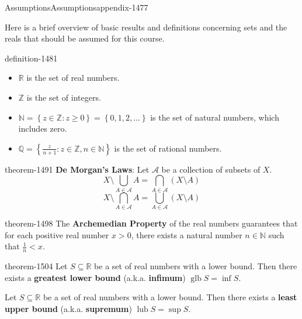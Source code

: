\documentclass[oneside,10pt,]{book}
\newcommand{\terminology}[1]{\textbf{#1}}
\newcommand{\mb}{\mathbb}
\newcommand{\mc}{\mathcal}
\newcommand{\glb}{\operatorname{glb}}
\newcommand{\lub}{\operatorname{lub}}
\newcommand{\setBuilder}[2]{\left\{#1:#2\right\}}
\newcommand{\setList}[1]{\left\{#1\right\}}
\newcommand{\lt}{<}
\begin{document}
%
%
%
%
\typeout{************************************************}
\typeout{************************************************}
%
%
\appendix
%
\begin{appendixptx}{Assumptions}{}{Assumptions}{}{}{appendix-1477}
\begin{introduction}{}%
\hypertarget{p-1480}{}%
Here is a brief overview of basic results and definitions concerning sets and the reals that should be assumed for this course.%
\end{introduction}%
\begin{definition}{}{definition-1481}%
\leavevmode%
\begin{itemize}[label=\textbullet]
\item{}\(\mb R\) is the set of real numbers.%
\item{}\(\mb Z\) is the set of integers.%
\item{}\(\mb N=\setBuilder{z\in\mb Z}{z\geq 0}=\setList{0,1,2,\dots}\) is the set of natural numbers, which includes zero.%
\item{}\(\mb Q=\setBuilder{\frac{z}{n+1}}{z\in\mb Z,n\in\mb N}\) is the set of rational numbers.%
\end{itemize}
\end{definition}
\begin{theorem}{}{}{theorem-1491}%
\hypertarget{p-1492}{}%
\terminology{De Morgan's Laws}: Let \(\mc A\) be a collection of subsets of \(X\).%
%
\begin{equation*}
X\setminus\bigcup_{A\in\mc A}A=\bigcap_{A\in\mc A}(X\setminus A)
\end{equation*}
%
\begin{equation*}
X\setminus\bigcap_{A\in\mc A}A=\bigcup_{A\in\mc A}(X\setminus A)
\end{equation*}
\end{theorem}
\begin{theorem}{}{}{theorem-1498}%
\hypertarget{p-1499}{}%
The \terminology{Archemedian Property} of the real numbers guarantees that for each positive real number \(x>0\), there exists a natural number \(n\in\mb N\) such that \(\frac{1}{n}\lt x\).%
\end{theorem}
\begin{theorem}{}{}{theorem-1504}%
\hypertarget{p-1505}{}%
Let \(S\subseteq \mb R\) be a set of real numbers with a lower bound. Then there exists a \terminology{greatest lower bound} (a.k.a. \terminology{infimum}) \(\glb S=\inf S\).%
\par
\hypertarget{p-1510}{}%
Let \(S\subseteq \mb R\) be a set of real numbers with a lower bound. Then there exists a \terminology{least upper bound} (a.k.a. \terminology{supremum}) \(\lub S=\sup S\).%
\end{theorem}
\end{appendixptx}
%
\backmatter
%
\end{document}
